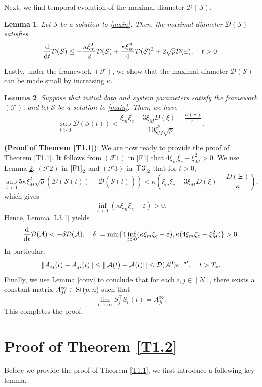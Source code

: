 \documentclass[11pt,reqno]{amsart}
\numberwithin{figure}{section}
\newcommand{\opnorm}[1]{{ \vert\kern-0.25ex \vert\kern-0.25ex \vert #1 
     \vert\kern-0.25ex \vert\kern-0.25ex \vert}}
\newcommand{\kp}{\kappa}
\newcommand{\veps}{\varepsilon}
\newcommand{\dd}{  {\textup{d}} }
\newcommand{\dt} {    {  \textup{d}t   }    }
\newcommand{\St}{  {\textup{St}}(p,n) }
\newtheorem{lemma}{Lemma}[section]
\begin{document}
Next, we find temporal evolution of the maximal diameter $\mathcal D(\mathcal S)$. 
\begin{lemma} \label{L3.2}
Let $\mathcal S$ be a solution to \eqref{main}. Then, the maximal diameter $\mathcal D(\mathcal S)$ satisfies
\[
\frac\dd\dt \mathcal D(\mathcal S) \leq -\frac{\kp \xi_m^2 }{2} \mathcal D(\mathcal S) + \frac{\kp \xi_m^2}{4}\mathcal D(\mathcal S)^3 +2\sqrt p \mathcal D(\Xi), \quad t>0.
\]
\end{lemma}

Lastly, under the framework $(\mathcal F)$, we show that the maximal diameter $\mathcal D(\mathcal S)$ can be made small by increasing $\kp$. 

\begin{lemma} \label{L3.3}
 Suppose that initial data and system parameters satisfy the framework $(\mathcal F)$, and let $\mathcal S$ be a solution to \eqref{main}. Then, we have
 \[
 \sup_{t>0}\mathcal D(\mathcal S(t))< \frac{\xi_m\xi_c-3\xi_MD(\xi)-\frac{D(\Xi)}{\kappa}}{10 \xi_M^2 \sqrt p}.
 \]
\end{lemma}


\noindent \textbf{(Proof of Theorem \ref{T1.1})}: We are now ready to provide the proof of Theorem \ref{T1.1}. It  follows from $(\mathcal F1)$ in \eqref{F1} that $4\xi_m \xi_c -\xi_M^2>0$. We use Lemma \ref{L3.3}, $(\mathcal F2)$ in $\eqref{F1}_2$ and $(\mathcal F3)$ in $\eqref{F3}_2$ that for $t>0$, 
\[
\sup_{t>0}5\kp \xi_M^2 \sqrt p ( \mathcal D(\mathcal S(t)) + \mathcal D(\tilde{\mathcal S}(t))) < \kappa(\xi_m\xi_c-3\xi_MD(\xi)-\frac{D(\Xi)}{\kappa}), \]
which gives
\[
\inf_{t>0}(\kappa\xi_m\xi_c - \veps) >0.
\]
Hence, Lemma \ref{L3.1} yields
\[
\frac\dd\dt \mathcal D(\mathcal A)  < - \delta \mathcal D(\mathcal A),\quad \delta:= \min \{ 4\inf_{t>0}(\kappa\xi_m\xi_c - \veps), \kappa(4\xi_m\xi_c-\xi_M^2) \}>0.
\]
In particular, 
\[
\| A_{ij} (t) - \tilde A_{ji} (t) \| \leq  \opnorm{\mathcal A (t) -\tilde{\mathcal A}(t)} \leq \mathcal D(\mathcal A^0) e^{-\delta t},\quad t>T_*.
\]
Finally, we use Lemma \ref{conv} to conclude that for each $i,j\in [N]$, there exists a constant matrix $A_{ji}^\infty \in \St$ such that
\[
\lim_{t\to\infty} S_j^\top S_i(t) = A_{ji}^\infty.
\]
This completes the proof. 



\section{Proof of Theorem \ref{T1.2}} \label{sec:4} 
\setcounter{equation}{0}
Before we provide the proof of Theorem \ref{T1.1}, we first introduce a following key lemma. 
\end{document}
